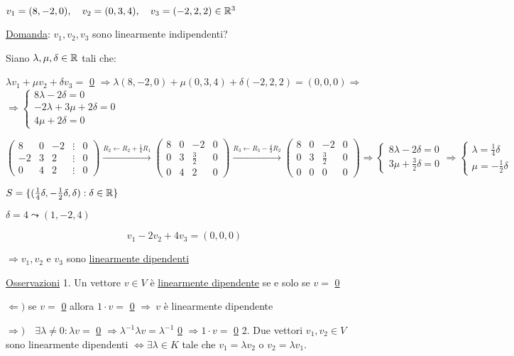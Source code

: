 \documentclass{article}
\begin{document}
$v_1=(8,-2,0),\quad v_2=(0,3,4),\quad v_3=(-2,2,2)\in\mathbb{R}^3$

\ul{Domanda}: $v_1,v_2,v_3$ sono linearmente indipendenti?

Siano $\lambda,\mu,\delta\in\mathbb{R}$ tali che:

$\lambda v_1+\mu v_2+\delta v_3=$ \ul{0} $\Rightarrow\lambda(8,-2,0)+\mu(0,3,4)+\delta(-2,2,2)=(0,0,0)\Rightarrow$
$\Rightarrow
\begin{cases}
  8\lambda-2\delta=0\\
  -2\lambda+3\mu+2\delta=0\\
  4\mu+2\delta=0
\end{cases}$

$\begin{pmatrix}
  8&0&-2&\vdots&0\\
  -2&3&2&\vdots&0\\
  0&4&2&\vdots&0
\end{pmatrix}\xrightarrow{R_2\leftarrow R_2+\frac{1}{4}R_1}
\begin{pmatrix}
  8&0&-2&0\\
  0&3&\frac{3}{2}&0\\
  0&4&2&0
\end{pmatrix}\xrightarrow{R_3\leftarrow R_3-\frac{4}{3}R_2}
\begin{pmatrix}
  8&0&-2&0\\
  0&3&\frac{3}{2}&0\\
  0&0&0&0
\end{pmatrix}\Rightarrow
\begin{cases}
8\lambda-2\delta=0\\
3\mu+\frac{3}{2}\delta=0
\end{cases}\Rightarrow
\begin{cases}
\lambda=\frac{1}{4}\delta\\
\mu=-\frac{1}{2}\delta
\end{cases}$

$S=\{(\frac{1}{4}\delta,-\frac{1}{2}\delta,\delta):\delta\in\mathbb{R}\}$

$\delta=4\leadsto(1,-2,4)$

$$v_1-2v_2+4v_3=(0,0,0)$$

$\Rightarrow v_1,v_2$ e $v_3$ sono \ul{linearmente dipendenti}

\ul{Osservazioni}
1. Un vettore $v\in V$ è \ul{linearmente dipendente} se e solo se $v=$ \ul{0}

   $\Leftarrow)$ se $v=$ \ul{0} allora $1\cdot v=$ \ul{0} $\Rightarrow\ v$ è linearmente dipendente

   $\Rightarrow)\quad\exists\lambda\not=0:\lambda v=$ \ul{0} $\Rightarrow\lambda^{-1}\lambda v=\lambda^{-1}$ \ul{0} $\Rightarrow1\cdot v=$ \ul{0}
2. Due vettori $v_1,v_2\in V$ sono linearmente dipendenti $\Leftrightarrow\exists\lambda\in K$ tale che $v_1=\lambda v_2$ o $v_2=\lambda v_1$.
\end{document}
